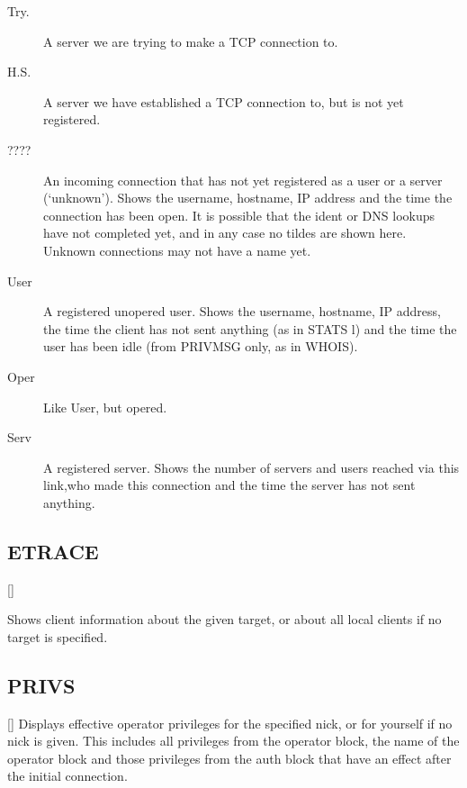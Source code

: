 \noindent
\begin{description}
\item[{Try.}]
	A server we are trying to make a TCP connection to.

\item[{H.S.}]
	A server we have established a TCP connection to, but is not
	yet registered.

\item[{????}]
	An incoming connection that has not yet registered as a user or a
	server (`unknown'). Shows the username, hostname, IP address and the
	time the connection has been open. It is possible that the ident or DNS
	lookups have not completed yet, and in any case no tildes are shown
	here. Unknown connections may not have a name yet.

\item[{User}]
	A registered unopered user. Shows the username, hostname, IP address,
	the time the client has not sent anything (as in STATS l) and the time
	the user has been idle (from PRIVMSG only, as in WHOIS).

\item[{Oper}]
	Like User, but opered.

\item[{Serv}]
	A registered server. Shows the number of servers and users reached via
	this link,who made this connection and the time the server has not sent
	anything.

\end{description}

\subsection{ETRACE}

	[]

	Shows client information about the given target, or about all local
	clients if no target is specified.

\subsection{PRIVS}

 []
	Displays effective operator privileges for the specified nick, or for
	yourself if no nick is given. This includes all privileges from the
	operator block, the name of the operator block and those privileges
	from the auth block that have an effect after the initial connection.

